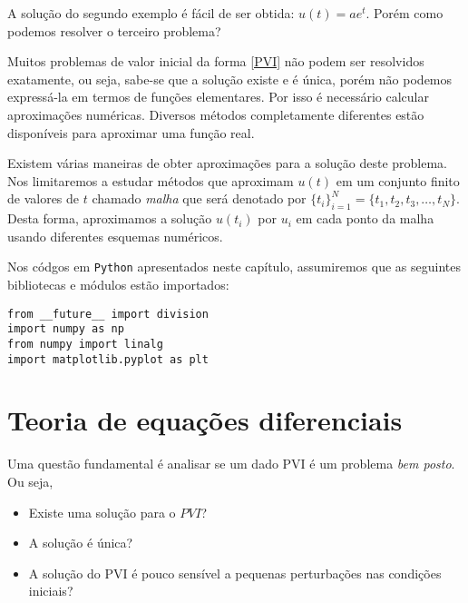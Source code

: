 A solução do segundo exemplo é fácil de ser obtida: $u(t)=ae^t$. Porém como podemos resolver o terceiro problema?


%


Muitos problemas de valor inicial da forma \eqref{PVI} não podem ser resolvidos exatamente, ou seja, sabe-se que a solução existe e é única, porém não podemos expressá-la em termos de funções elementares. Por isso é necessário calcular aproximações numéricas. Diversos métodos completamente diferentes estão disponíveis para aproximar uma função real.

Existem várias maneiras de obter aproximações para a solução deste problema. Nos limitaremos a estudar métodos que aproximam $u(t)$ em um conjunto finito de valores de $t$ chamado \emph{malha} que será denotado por  $\{t_i\}_{i=1}^N=\{t_1, t_2, t_3,\ldots, t_N\}$. Desta forma, aproximamos a solução $u(t_i)$ por $u_i$ em cada ponto da malha usando diferentes esquemas numéricos.

\ifispython
Nos códgos em \verb+Python+ apresentados neste capítulo, assumiremos que as seguintes bibliotecas e módulos estão importados:
\begin{verbatim}
from __future__ import division
import numpy as np
from numpy import linalg
import matplotlib.pyplot as plt
\end{verbatim}
\fi

\section{Teoria de equações diferenciais}
Uma questão fundamental é analisar se um dado PVI é um problema \emph{bem posto}. Ou seja,
\begin{itemize}
 \item Existe uma solução para o $PVI$?
 \item A solução é única?
 \item A solução do PVI é pouco sensível a pequenas perturbações nas condições iniciais?
\end{itemize}


